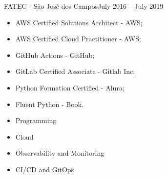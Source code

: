 
 {FATEC - São José dos Campos}{July 2016 -- July 2019}{}

\divider


\divider


\divider

\begin{itemize}
    \item AWS Certified Solutions Architect - AWS;
    \item AWS Certified Cloud Practitioner - AWS;
    \item GitHub Actions - GitHub;
    \item GitLab Certified Associate - Gitlab Inc;
    \item Python Formation Certified - Alura;
    \item Fluent Python - Book.
\end{itemize}



\begin{itemize}
    \item Programming
\end{itemize}


\divider

\begin{itemize}
    \item Cloud
\end{itemize}


\divider

\begin{itemize}
    \item Observability and Monitoring
\end{itemize}


\divider



\begin{itemize}
    \item CI/CD and GitOps
\end{itemize}


